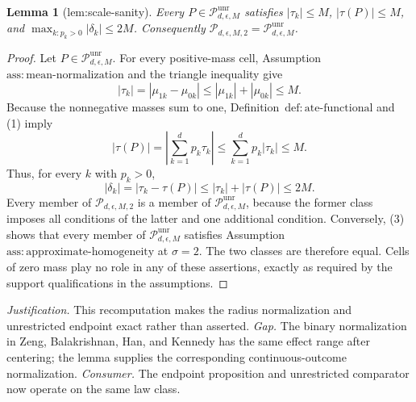 \documentclass{article}
\newtheorem{lemma}{Lemma}
\begin{document}
\begin{lemma}[lem:scale-sanity]\label{lem:scale-sanity}
Every \(P\in\mathcal P_{d,\epsilon,M}^{\mathrm{unr}}\) satisfies \(|\tau_k|\le M\), \(|\tau(P)|\le M\), and \(\max_{k:p_k>0}|\delta_k|\le2M\). Consequently \(\mathcal P_{d,\epsilon,M,2}=\mathcal P_{d,\epsilon,M}^{\mathrm{unr}}\).
\end{lemma}
\begin{proof}
Let \(P\in\mathcal P_{d,\epsilon,M}^{\mathrm{unr}}\).  For every positive-mass cell, Assumption~\(\mathrm{ass:mean\text{-}normalization}\) and the triangle inequality give
\[
 |\tau_k|=|\mu_{1k}-\mu_{0k}|
 \le |\mu_{1k}|+|\mu_{0k}|
 \le M.
\tag{1}
\]
Because the nonnegative masses sum to one, Definition~\(\mathrm{def:ate\text{-}functional}\) and (1) imply
\[
 |\tau(P)|=\left|\sum_{k=1}^d p_k\tau_k\right|
 \le \sum_{k=1}^d p_k|\tau_k|
 \le M.
\tag{2}
\]
Thus, for every \(k\) with \(p_k>0\),
\[
 |\delta_k|=|\tau_k-\tau(P)|
 \le |\tau_k|+|\tau(P)|
 \le 2M.
\tag{3}
\]
Every member of \(\mathcal P_{d,\epsilon,M,2}\) is a member of \(\mathcal P_{d,\epsilon,M}^{\mathrm{unr}}\), because the former class imposes all conditions of the latter and one additional condition.  Conversely, (3) shows that every member of \(\mathcal P_{d,\epsilon,M}^{\mathrm{unr}}\) satisfies Assumption~\(\mathrm{ass:approximate\text{-}homogeneity}\) at \(\sigma=2\).  The two classes are therefore equal.  Cells of zero mass play no role in any of these assertions, exactly as required by the support qualifications in the assumptions.
\end{proof}
\par\smallskip\noindent \textit{Justification.} This recomputation makes the radius normalization and unrestricted endpoint exact rather than asserted. \textit{Gap.} The binary normalization in Zeng, Balakrishnan, Han, and Kennedy has the same effect range after centering; the lemma supplies the corresponding continuous-outcome normalization. \textit{Consumer.} The endpoint proposition and unrestricted comparator now operate on the same law class.
\end{document}
